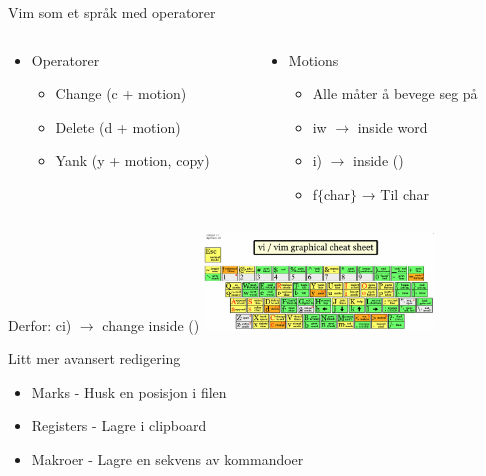 \documentclass{beamer}
\begin{document}
\begin{frame}{Vim som et språk med operatorer}
	\begin{center}
		\begin{columns}
			\begin{column}{0.5\textwidth}
				\begin{itemize}
					\item Operatorer
					      \begin{itemize}
						      \item Change (c + motion)
						      \item Delete (d + motion)
						      \item Yank (y + motion, copy)
					      \end{itemize}
				\end{itemize}
			\end{column}
			\begin{column}{0.5\textwidth}
				\begin{itemize}
					\item Motions
					      \begin{itemize}
						      \item Alle måter å bevege seg på
						      \item iw $\rightarrow$ inside word
						      \item i) $\rightarrow$ inside ()
                              \item f$\{$char$\}$ → Til char
					      \end{itemize}
				\end{itemize}
			\end{column}
		\end{columns}
		\vspace{20px}
		Derfor: ci) $\rightarrow$ change inside ()
		{\includegraphics[width=230px]{images/vim-cheat-sheet.png}}
	\end{center}
\end{frame}

\begin{frame}{Litt mer avansert redigering}
    \begin{itemize}
        \item Marks - Husk en posisjon i filen
        \item Registers - Lagre i clipboard
        \item Makroer - Lagre en sekvens av kommandoer
    \end{itemize}
\end{frame}
\end{document}
